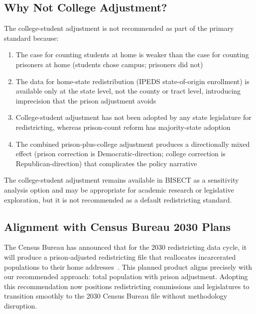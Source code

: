 \subsection{Why Not College Adjustment?}

The college-student adjustment is not recommended as part of the primary standard because:
\begin{enumerate}
    \item The case for counting students at home is weaker than the case for counting prisoners at home (students chose campus; prisoners did not)
    \item The data for home-state redistribution (IPEDS state-of-origin enrollment) is available only at the state level, not the county or tract level, introducing imprecision that the prison adjustment avoids
    \item College-student adjustment has not been adopted by any state legislature for redistricting, whereas prison-count reform has majority-state adoption
    \item The combined prison-plus-college adjustment produces a directionally mixed effect (prison correction is Democratic-direction; college correction is Republican-direction) that complicates the policy narrative
\end{enumerate}

The college-student adjustment remains available in BISECT as a sensitivity analysis option and may be appropriate for academic research or legislative exploration, but it is not recommended as a default redistricting standard.

\subsection{Alignment with Census Bureau 2030 Plans}

The Census Bureau has announced that for the 2030 redistricting data cycle, it will produce a prison-adjusted redistricting file that reallocates incarcerated populations to their home addresses~\citep{census2022prison_adjustment}. This planned product aligns precisely with our recommended approach: total population with prison adjustment. Adopting this recommendation now positions redistricting commissions and legislatures to transition smoothly to the 2030 Census Bureau file without methodology disruption.
